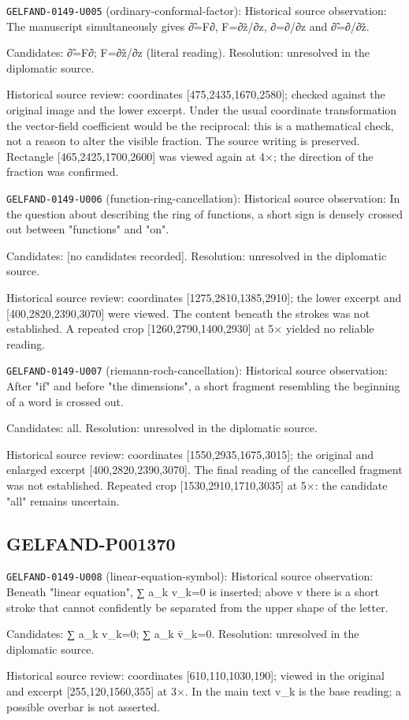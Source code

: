\noindent\texttt{GELFAND-0149-U005} (ordinary-conformal-factor): Historical source observation: The manuscript simultaneously gives ∂̃=F∂, F=∂z̃/∂z, ∂=∂/∂z and ∂̃=∂/∂z̃.\par
Candidates: ∂̃=F∂; F=∂z̃/∂z (literal reading). Resolution: unresolved in the diplomatic source.\par
Historical source review: coordinates [475,2435,1670,2580]; checked against the original image and the lower excerpt. Under the usual coordinate transformation the vector-field coefficient would be the reciprocal: this is a mathematical check, not a reason to alter the visible fraction. The source writing is preserved. Rectangle [465,2425,1700,2600] was viewed again at 4×; the direction of the fraction was confirmed.\par

\noindent\texttt{GELFAND-0149-U006} (function-ring-cancellation): Historical source observation: In the question about describing the ring of functions, a short sign is densely crossed out between "functions" and "on".\par
Candidates: [no candidates recorded]. Resolution: unresolved in the diplomatic source.\par
Historical source review: coordinates [1275,2810,1385,2910]; the lower excerpt and [400,2820,2390,3070] were viewed. The content beneath the strokes was not established. A repeated crop [1260,2790,1400,2930] at 5× yielded no reliable reading.\par

\noindent\texttt{GELFAND-0149-U007} (riemann-roch-cancellation): Historical source observation: After "if" and before "the dimensions", a short fragment resembling the beginning of a word is crossed out.\par
Candidates: all. Resolution: unresolved in the diplomatic source.\par
Historical source review: coordinates [1550,2935,1675,3015]; the original and enlarged excerpt [400,2820,2390,3070]. The final reading of the cancelled fragment was not established. Repeated crop [1530,2910,1710,3035] at 5×: the candidate "all" remains uncertain.\par

\subsection*{GELFAND-P001370}
\noindent\texttt{GELFAND-0149-U008} (linear-equation-symbol): Historical source observation: Beneath "linear equation", ∑ a\_k v\_k=0 is inserted; above v there is a short stroke that cannot confidently be separated from the upper shape of the letter.\par
Candidates: ∑ a\_k v\_k=0; ∑ a\_k v̄\_k=0. Resolution: unresolved in the diplomatic source.\par
Historical source review: coordinates [610,110,1030,190]; viewed in the original and excerpt [255,120,1560,355] at 3×. In the main text v\_k is the base reading; a possible overbar is not asserted.\par

